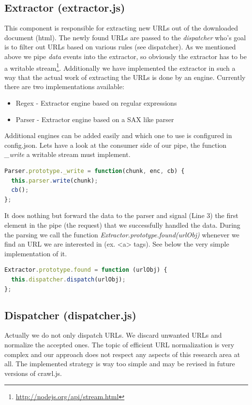 \subsection{Extractor (extractor.js)}
This component is responsible for extracting new URLs out of the downloaded document (html). The newly found URLs are passed to the \emph{dispatcher} who's goal is to filter out URLs based on various rules (see dispatcher). As we mentioned above we pipe \emph{data} events into the extractor, so obviously the extractor has to be a writable stream\footnote{\url{http://nodejs.org/api/stream.html}}. Additionally we have implemented the extractor in such a way that the actual work of extracting the URLs is done by an engine. Currently there are two implementations available:
\begin{itemize}
  \item Regex - Extractor engine based on regular expressions
  \item Parser - Extractor engine based on a SAX like parser
\end{itemize}
Additional engines can be added easily and which one to use is configured in config.json. Lets have a look at the consumer side of our pipe, the function \emph{\_write} a writable stream must implement.

\begin{lstlisting}[language=JavaScript]
Parser.prototype._write = function(chunk, enc, cb) {
  this.parser.write(chunk);
  cb();
};
\end{lstlisting}

It does nothing but forward the data to the parser and signal (Line 3) the first element in the pipe (the request) that we successfully handled the data. During the parsing we call the function \emph{Extractor.prototype.found(urlObj)} whenever we find an URL we are interested in (ex. <a> tags). See below the very simple implementation of it.

\begin{lstlisting}[language=JavaScript]
Extractor.prototype.found = function (urlObj) {
  this.dispatcher.dispatch(urlObj);
};
\end{lstlisting}

\subsection{Dispatcher (dispatcher.js)}
Actually we do not only dispatch URLs. We discard unwanted URLs and normalize the accepted ones. The topic of efficient URL normalization\cite{wiki:url_normalization} is very complex and our approach does not respect any aspects of this research area at all. The implemented strategy is way too simple and may be revised in future versions of crawl.js.

